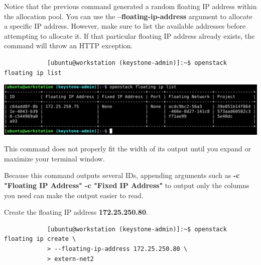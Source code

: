\documentclass[letterpaper, 12pt]{article}
\begin{document}
\begin{enumerate}
    \begin{labstep}
        Notice that the previous command generated a random floating IP address within the allocation pool.
        You can use the \textbf{--floating-ip-address} argument to allocate a specific IP address.
        However, make sure to list the available addresses before attempting to allocate it.
        If that particular floating IP address already exists, the command will throw an HTTP exception.
        \begin{lstlisting}
            [ubuntu@workstation (keystone-admin)]:~$ openstack floating ip list
        \end{lstlisting}

        \begin{center}
            \includegraphics[width=\linewidth]{images/part3/step15.png}
        \end{center}
    \end{labstep}

    \begin{tipbox}
        This command does not properly fit the width of its output until you expand or maximize your terminal window.
    \end{tipbox}
    \begin{tipbox}
        Because this command outputs several IDs, appending arguments such as \textbf{-c "Floating IP Address" -c "Fixed IP Address"} to output only the columns you need can make the output easier to read. %
    \end{tipbox}

    \begin{labstep}
        Create the floating IP address \textbf{172.25.250.80}.
        \begin{lstlisting}
            [ubuntu@workstation (keystone-admin)]:~$ openstack floating ip create \
            > --floating-ip-address 172.25.250.80 \
            > extern-net2
        \end{lstlisting}


\end{labstep}
\end{enumerate}
\end{document}
